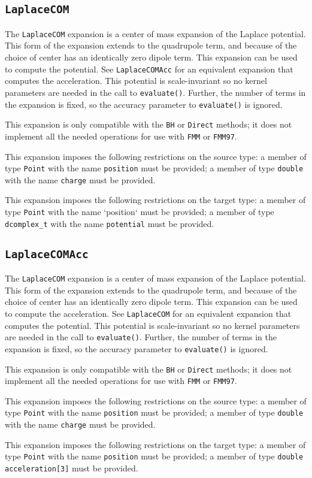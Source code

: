 \subsection{\texttt{LaplaceCOM}}

The \texttt{LaplaceCOM} expansion is a center of mass expansion of the Laplace
potential. This form of the expansion extends to the quadrupole term, and
because of the choice of center has an identically zero dipole term. This
expansion can be used to compute the potential. See \texttt{LaplaceCOMAcc} for an
equivalent expansion that computes the acceleration. This potential is
scale-invariant so no kernel parameters are needed in the call to
\texttt{evaluate()}.
Further, the number of terms in the expansion is fixed, so the accuracy
parameter to \texttt{evaluate()} is ignored.

This expansion is only compatible with the \texttt{BH} or \texttt{Direct}
methods; it does not implement all the needed operations for use with
\texttt{FMM} or \texttt{FMM97}.

This expansion imposes the following restrictions on the source type: a
member of type \texttt{Point} with the name \texttt{position} must be provided;
a member of type \texttt{double} with the name \texttt{charge} must be
provided.

This expansion imposes the following restrictions on the target type: a
member of type \texttt{Point} with the name `position` must be provided; a
member of type \texttt{dcomplex\_t} with the name \texttt{potential} must be
provided.

\subsection{\texttt{LaplaceCOMAcc}}

The \texttt{LaplaceCOM} expansion is a center of mass expansion of the Laplace
potential. This form of the expansion extends to the quadrupole term, and
because of the choice of center has an identically zero dipole term. This
expansion can be used to compute the acceleration. See \texttt{LaplaceCOM} for
an equivalent expansion that computes the potential. This potential is
scale-invariant so no kernel parameters are needed in the call to
\texttt{evaluate()}. Further, the number of terms in the expansion is fixed,
so the accuracy parameter to \texttt{evaluate()} is ignored.

This expansion is only compatible with the \texttt{BH} or \texttt{Direct}
methods; it does not implement all the needed operations for use with
\texttt{FMM} or \texttt{FMM97}.

This expansion imposes the following restrictions on the source type: a
member of type \texttt{Point} with the name \texttt{position} must be provided;
a member of  type \texttt{double} with the name \texttt{charge} must be
provided.

This expansion imposes the following restrictions on the target type: a
member of type \texttt{Point} with the name \texttt{position} must be provided;
a member of type \texttt{double acceleration[3]} must
be provided.
